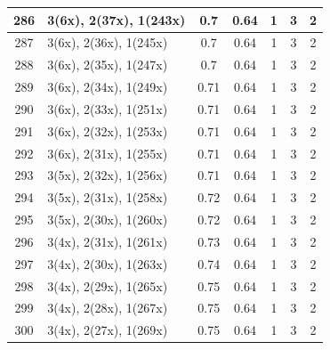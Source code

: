 \begin{small}
\begin{longtable}{|c|p{4cm}|c|c|c|c|c|}
  286 & 3(6x), 2(37x), 1(243x) & \cellcolor{colorBad}  0.7 & \cellcolor{colorBad} 0.64 & 1 & 3 & \cellcolor{colorGood} 2 \\   \hline
  287 & 3(6x), 2(36x), 1(245x) & \cellcolor{colorBad}  0.7 & \cellcolor{colorBad} 0.64 & 1 & 3 & \cellcolor{colorGood} 2 \\   \hline
  288 & 3(6x), 2(35x), 1(247x) & \cellcolor{colorBad}  0.7 & \cellcolor{colorBad} 0.64 & 1 & 3 & \cellcolor{colorGood} 2 \\   \hline
  289 & 3(6x), 2(34x), 1(249x) & \cellcolor{colorBad}  0.71 & \cellcolor{colorBad} 0.64 & 1 & 3 & \cellcolor{colorGood} 2 \\   \hline
  290 & 3(6x), 2(33x), 1(251x) & \cellcolor{colorBad}  0.71 & \cellcolor{colorBad} 0.64 & 1 & 3 & \cellcolor{colorGood} 2 \\   \hline
  291 & 3(6x), 2(32x), 1(253x) & \cellcolor{colorBad}  0.71 & \cellcolor{colorBad} 0.64 & 1 & 3 & \cellcolor{colorGood} 2 \\   \hline
  292 & 3(6x), 2(31x), 1(255x) & \cellcolor{colorBad}  0.71 & \cellcolor{colorBad} 0.64 & 1 & 3 & \cellcolor{colorGood} 2 \\   \hline
  293 & 3(5x), 2(32x), 1(256x) & \cellcolor{colorBad}  0.71 & \cellcolor{colorBad} 0.64 & 1 & 3 & \cellcolor{colorGood} 2 \\   \hline
  294 & 3(5x), 2(31x), 1(258x) & \cellcolor{colorBad}  0.72 & \cellcolor{colorBad} 0.64 & 1 & 3 & \cellcolor{colorGood} 2 \\   \hline
  295 & 3(5x), 2(30x), 1(260x) & \cellcolor{colorBad}  0.72 & \cellcolor{colorBad} 0.64 & 1 & 3 & \cellcolor{colorGood} 2 \\   \hline
  296 & 3(4x), 2(31x), 1(261x) & \cellcolor{colorBad}  0.73 & \cellcolor{colorBad} 0.64 & 1 & 3 & \cellcolor{colorGood} 2 \\   \hline
  297 & 3(4x), 2(30x), 1(263x) & \cellcolor{colorBad}  0.74 & \cellcolor{colorBad} 0.64 & 1 & 3 & \cellcolor{colorGood} 2 \\   \hline
  298 & 3(4x), 2(29x), 1(265x) & \cellcolor{colorBad}  0.75 & \cellcolor{colorBad} 0.64 & 1 & 3 & \cellcolor{colorGood} 2 \\   \hline
  299 & 3(4x), 2(28x), 1(267x) & \cellcolor{colorBad}  0.75 & \cellcolor{colorBad} 0.64 & 1 & 3 & \cellcolor{colorGood} 2 \\   \hline
  300 & 3(4x), 2(27x), 1(269x) & \cellcolor{colorBad}  0.75 & \cellcolor{colorBad} 0.64 & 1 & 3 & \cellcolor{colorGood} 2 \\   \hline

\end{longtable}
\end{small}
